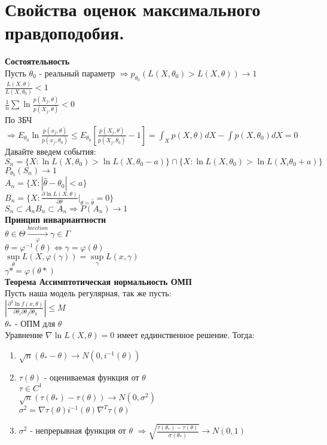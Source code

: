\documentclass{article}
\newcommand\0{\mathbb{0}}
\newcommand\1{\mathbb{1}}
\renewcommand{\bf}{\textbf}
\newcommand{\xrto}{\xrightarrow}
\newcommand{\Rto}{\Rightarrow}
\newcommand{\LRto}{\Leftrightarrow}
\begin{document}
\section{Свойства оценок максимального правдоподобия.}
\bf{Состоятельность}\\
Пусть $\theta_0$ - реальный параметр $\Rightarrow p_{\theta_0}(L(X, \theta_0) > L(X, \theta)) \to 1$\\
$\frac{L(X, \theta)}{L(X, \theta_0)} < 1$\\
$\frac{1}{n}\displaystyle\sum \ln{\frac{p(X_j, \theta)}{p(X_j, \theta)}} < 0$\\
По ЗБЧ $\Rightarrow E_{\theta_0} \ln{\frac{p(x_j, \theta)}{p(x_j, \theta_0)}} \leq E_{\theta_0} [\frac{p(X_j, \theta)}{p(X_j, \theta_0)} - 1] = \displaystyle\int_X p(X, \theta)dX - \displaystyle\int p(X, \theta_0)dX = 0$\\
Давайте введем события:\\
$S_n = \{X : \ln{L(X, \theta_0)} > \ln{L(X, \theta_0 - a)}\} \cap \{X : \ln{L(X, \theta_0)} > \ln{L(X_i \theta_0 + a)}\}$\\
$P_{\theta_0}(S_n) \to 1$\\
$A_n = \{X : |\widehat{\theta} - \theta_0| < a\}$\\
$B_n = \{X : \frac{\partial \ln{L(X, \theta)}}{\partial \theta} |_{\theta = \widehat{\theta}} = 0\}$\\
$S_n \subset A_n B_n \subset A_n \Rightarrow P(A_n) \to 1$\\
\bf{Принцип инвариантности}\\
$\theta \in \Theta \xrto[\varphi]{biection} \gamma \in \Gamma$\\
$\theta = \varphi^{-1}(\theta) \LRto \gamma = \varphi(\theta)$\\
$\underset{\theta}{\sup}L(X, \varphi(\gamma)) = \underset{\gamma}{\sup}L(x, \gamma)$\\
$\gamma* = \varphi(\theta*)$\\
\textbf{Теорема Ассимптотическая нормальность ОМП}\\
Пусть наша модель регулярная, так же пусть:\\
$|\frac{\partial^3 \ln{f(x, \theta)}}{\partial \theta_i \partial \theta_j \partial \theta_k}| \leq M$\\
$\theta_*$ - ОПМ для $\theta$\\
Уравнение $\nabla \ln{L(X, \theta)} = 0$ имеет еддинственное решение.
Тогда:\\
\begin{enumerate}
    \item $\sqrt{n}(\theta_* - \theta) \to N(0, i^{-1}(\theta))$
    \item $\tau(\theta)$ - оцениваемая функция от $\theta$\\
    $\tau \in C^1$\\
    $\sqrt{n}(\tau(\theta_*) - \tau(\theta)) \to N(0, \sigma^2)$\\
    $\sigma^2 = \nabla\tau(\theta)i^{-1}(\theta)\nabla^T\tau(\theta)$
    \item $\sigma^2$ - непрерывная функция от $\theta$ $\Rto \sqrt{\frac{\tau(\theta_*) - \tau(\theta)}{\sigma(\theta_*)}} \to N(0, 1)$
\end{enumerate}
\end{document}
